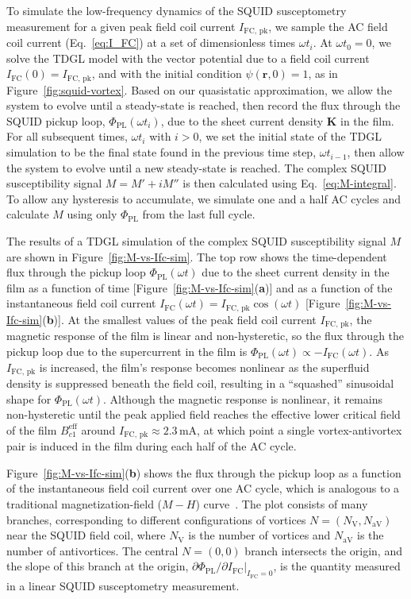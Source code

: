 \documentclass[%
 reprint,
 superscriptaddress,
 amsmath,
 amssymb,
 amsfonts,
 aps,
 prb,
]{revtex4-2}
\newcommand{\FC}{\mathrm{FC}}
\newcommand{\pk}{\mathrm{pk}}
\newcommand{\PL}{\mathrm{PL}}
\begin{document}
To simulate the low-frequency dynamics of the SQUID susceptometry measurement for a given peak field coil current $I_{\FC,\,\pk}$, we sample the AC field coil current (Eq.~\ref{eq:I_FC}) at a set of dimensionless times $\omega t_i$. At $\omega t_0=0$, we solve the TDGL model with the vector potential due to a field coil current $I_\FC(0)=I_{\FC,\,\pk}$, and with the initial condition $\psi(\mathbf{r}, 0)=1$, as in Figure~\ref{fig:squid-vortex}. Based on our quasistatic approximation, we allow the system to evolve until a steady-state is reached, then record the flux through the SQUID pickup loop, $\Phi_\PL(\omega t_i)$, due to the sheet current density $\mathbf{K}$ in the film. For all subsequent times, $\omega t_i$ with $i>0$,
we set the initial state of the TDGL simulation to be the final state found in the previous time step, $\omega t_{i-1}$, then allow the system to evolve until a new steady-state is reached. The complex SQUID susceptibility signal $M=M'+iM''$ is then calculated using Eq.~\ref{eq:M-integral}. To allow any hysteresis to accumulate, we simulate one and a half AC cycles and calculate $M$ using only $\Phi_\PL$ from the last full cycle.

The results of a TDGL simulation of the complex SQUID susceptibility signal $M$ are shown in Figure~\ref{fig:M-vs-Ifc-sim}. The top row shows the time-dependent flux through the pickup loop $\Phi_\PL(\omega t)$ due to the sheet current density in the film as a function of time [Figure~\ref{fig:M-vs-Ifc-sim}({\bf a})] and as a function of the instantaneous field coil current $I_\FC(\omega t)=I_{\FC,\,\pk}\cos(\omega t)$ [Figure~\ref{fig:M-vs-Ifc-sim}({\bf b})]. At the smallest values of the peak field coil current $I_{\FC,\,\pk}$, the magnetic response of the film is linear and non-hysteretic, so the flux through the  pickup loop due to the supercurrent in the film is $\Phi_\PL(\omega t)\propto -I_\FC(\omega t)$. As $I_{\FC,\,\pk}$ is increased, the film's response becomes nonlinear as the superfluid density is suppressed beneath the field coil, resulting in a ``squashed'' sinusoidal shape for $\Phi_\PL(\omega t)$. Although the magnetic response is nonlinear, it remains non-hysteretic until the peak applied field reaches the effective lower critical field of the film $B_{c1}^\mathrm{eff}$ around $I_{\FC,\,\pk}\approx 2.3\,\mathrm{mA}$, at which point a single vortex-antivortex pair is induced in the film during each half of the AC cycle.

Figure~\ref{fig:M-vs-Ifc-sim}({\bf b}) shows the flux through the pickup loop as a function of the instantaneous field coil current over one AC cycle, which is analogous to a traditional magnetization-field ($M-H$) curve~\cite{Clem1994-qu}. The plot consists of many branches, corresponding to different configurations of vortices $N=(N_\mathrm{V}, N_\mathrm{aV})$ near the SQUID field coil, where $N_\mathrm{V}$ is the number of vortices and $N_\mathrm{aV}$ is the number of antivortices. The central $N=(0, 0)$ branch intersects the origin, and the slope of this branch at the origin, $\left.\partial\Phi_\PL/\partial I_\FC\right|_{I_\FC=0}$, is the quantity measured in a linear SQUID susceptometry measurement.
\end{document}
